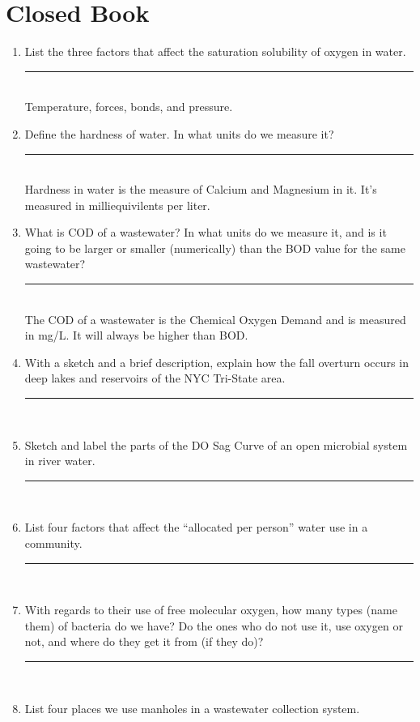\documentclass{article}
\begin{document}
\section*{Closed Book}
\begin{enumerate}
    \item List the three factors that affect the saturation solubility of oxygen in water.\\
    \rule{5cm}{1pt}\\
    Temperature, forces, bonds, and pressure.
    \item Define the hardness of water. In what units do we measure it?\\
    \rule{5cm}{1pt}\\
    Hardness in water is the measure of Calcium and Magnesium in it. It's measured in milliequivilents per liter.
    \item What is COD of a wastewater? In what units do we measure it, and is it going to be larger or smaller (numerically) than the BOD value for the same wastewater?\\
    \rule{5cm}{1pt}\\
    The COD of a wastewater is the Chemical Oxygen Demand and is measured in mg/L. It will always be higher than BOD. 
    \item With a sketch and a brief description, explain how the fall overturn occurs in deep lakes and reservoirs of the NYC Tri-State area.\\
    \rule{5cm}{1pt}\\
    \item Sketch and label the parts of the DO Sag Curve of an open microbial system in river water.\\
    \rule{5cm}{1pt}\\
    \item List four factors that affect the ``allocated per person'' water use in a community.\\
    \rule{5cm}{1pt}\\
    \item With regards to their use of free molecular oxygen, how many types (name them) of bacteria do we have? Do the ones who do not use it, use oxygen or not, and where do they get it from (if they do)?\\
    \rule{5cm}{1pt}\\
    \item List four places we use manholes in a wastewater collection system.\\

\end{enumerate}
\end{document}
